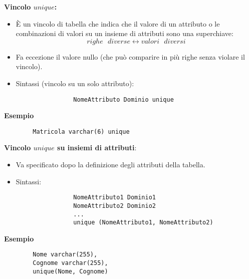 \textbf{Vincolo $unique$:}
    \begin{itemize}
        \item{È un vincolo di tabella che indica che il valore di un attributo o le combinazioni di valori su un insieme di attributi sono una superchiave:
            $$righe \text{ } diverse \leftrightarrow 
            valori \text{ } diversi$$}
        \item{Fa eccezione il valore nullo (che può comparire in più righe senza violare il vincolo).}
        \item{Sintassi (vincolo su un solo attributo):
            \begin{lstlisting}
                NomeAttributo Dominio unique
            \end{lstlisting}}
    \end{itemize}
\textbf{Esempio}
    \begin{lstlisting}
        Matricola varchar(6) unique
    \end{lstlisting}
    
\textbf{Vincolo $unique$ su insiemi di attributi}:
    \begin{itemize}
        \item{Va specificato dopo la definizione degli attributi della tabella.}
        \item{Sintassi:
            \begin{lstlisting}
                NomeAttributo1 Dominio1
                NomeAttributo2 Dominio2
                ...
                unique (NomeAttributo1, NomeAttributo2)
            \end{lstlisting}}
    \end{itemize}
\textbf{Esempio}
    \begin{lstlisting}
        Nome varchar(255),
        Cognome varchar(255),
        unique(Nome, Cognome)
    \end{lstlisting}
    
